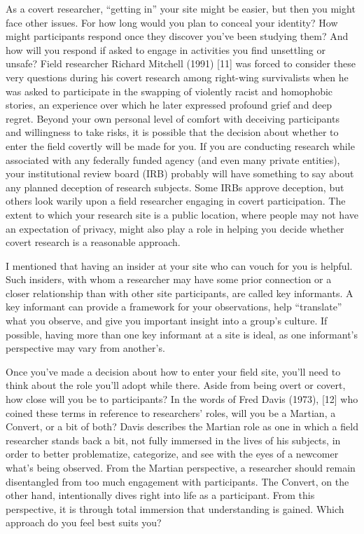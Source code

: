 As a covert researcher, ``getting in'' your site might be easier, but then you might face other issues. For how long would you plan to conceal your identity? How might participants respond once they discover you’ve been studying them? And how will you respond if asked to engage in activities you find unsettling or unsafe? Field researcher Richard Mitchell (1991) [11] was forced to consider these very questions during his covert research among right-wing survivalists when he was asked to participate in the swapping of violently racist and homophobic stories, an experience over which he later expressed profound grief and deep regret. Beyond your own personal level of comfort with deceiving participants and willingness to take risks, it is possible that the decision about whether to enter the field covertly will be made for you. If you are conducting research while associated with any federally funded agency (and even many private entities), your institutional review board (IRB) probably will have something to say about any planned deception of research subjects. Some IRBs approve deception, but others look warily upon a field researcher engaging in covert participation. The extent to which your research site is a public location, where people may not have an expectation of privacy, might also play a role in helping you decide whether covert research is a reasonable approach.

I mentioned that having an insider at your site who can vouch for you is helpful. Such insiders, with whom a researcher may have some prior connection or a closer relationship than with other site participants, are called key informants. A key informant can provide a framework for your observations, help ``translate'' what you observe, and give you important insight into a group’s culture. If possible, having more than one key informant at a site is ideal, as one informant’s perspective may vary from another’s.

Once you’ve made a decision about how to enter your field site, you’ll need to think about the role you’ll adopt while there. Aside from being overt or covert, how close will you be to participants? In the words of Fred Davis (1973), [12] who coined these terms in reference to researchers’ roles, will you be a Martian, a Convert, or a bit of both? Davis describes the Martian role as one in which a field researcher stands back a bit, not fully immersed in the lives of his subjects, in order to better problematize, categorize, and see with the eyes of a newcomer what’s being observed. From the Martian perspective, a researcher should remain disentangled from too much engagement with participants. The Convert, on the other hand, intentionally dives right into life as a participant. From this perspective, it is through total immersion that understanding is gained. Which approach do you feel best suits you?

